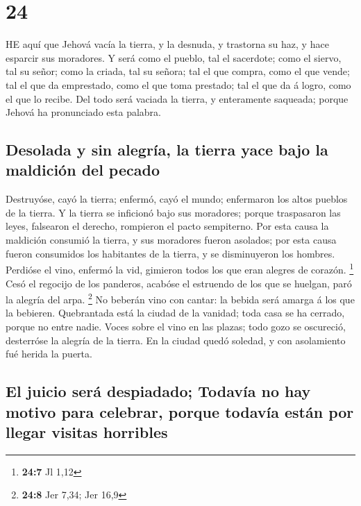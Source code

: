 \hypertarget{section-23}{%
\section{24}\label{section-23}}

 HE aquí que Jehová vacía la tierra, y la desnuda, y
trastorna su haz, y hace esparcir sus moradores.  Y será
como el pueblo, tal el sacerdote; como el siervo, tal su señor; como la
criada, tal su señora; tal el que compra, como el que vende; tal el que
da emprestado, como el que toma prestado; tal el que da á logro, como el
que lo recibe.  Del todo será vaciada la tierra, y
enteramente saqueada; porque Jehová ha pronunciado esta palabra.

\hypertarget{desolada-y-sin-alegruxeda-la-tierra-yace-bajo-la-maldiciuxf3n-del-pecado}{%
\subsection{Desolada y sin alegría, la tierra yace bajo la maldición del
pecado}\label{desolada-y-sin-alegruxeda-la-tierra-yace-bajo-la-maldiciuxf3n-del-pecado}}

 Destruyóse, cayó la tierra; enfermó, cayó el mundo;
enfermaron los altos pueblos de la tierra.  Y la tierra se
inficionó bajo sus moradores; porque traspasaron las leyes, falsearon el
derecho, rompieron el pacto sempiterno.  Por esta causa la
maldición consumió la tierra, y sus moradores fueron asolados; por esta
causa fueron consumidos los habitantes de la tierra, y se disminuyeron
los hombres.  Perdióse el vino, enfermó la vid, gimieron
todos los que eran alegres de corazón. \footnote{\textbf{24:7} Jl 1,12}
 Cesó el regocijo de los panderos, acabóse el estruendo de
los que se huelgan, paró la alegría del arpa. \footnote{\textbf{24:8}
  Jer 7,34; Jer 16,9}  No beberán vino con cantar: la bebida
será amarga á los que la bebieren.  Quebrantada está la
ciudad de la vanidad; toda casa se ha cerrado, porque no entre nadie.
 Voces sobre el vino en las plazas; todo gozo se oscureció,
desterróse la alegría de la tierra.  En la ciudad quedó
soledad, y con asolamiento fué herida la puerta.

\hypertarget{el-juicio-seruxe1-despiadado-todavuxeda-no-hay-motivo-para-celebrar-porque-todavuxeda-estuxe1n-por-llegar-visitas-horribles}{%
\subsection{El juicio será despiadado; Todavía no hay motivo para
celebrar, porque todavía están por llegar visitas
horribles}\label{el-juicio-seruxe1-despiadado-todavuxeda-no-hay-motivo-para-celebrar-porque-todavuxeda-estuxe1n-por-llegar-visitas-horribles}}

